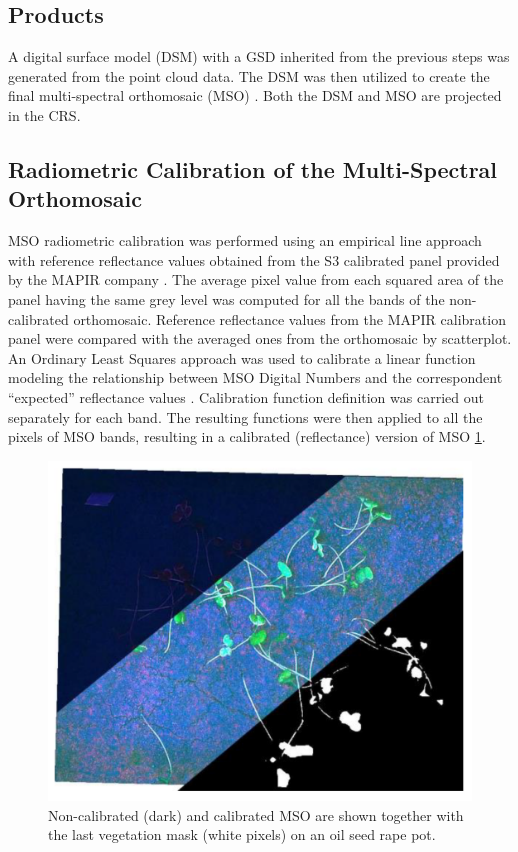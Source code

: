 \documentclass[12pt,a4paper,oneside]{report}
\begin{document}
\subsection{Products}

A digital surface model (DSM) with a GSD inherited from the previous steps was generated from the point cloud data. The DSM was then utilized to create the final multi-spectral orthomosaic (MSO)
\cite{gomarascaElementsPhotogrammetry2009}.
Both the DSM and MSO are projected in the CRS.

\subsection{Radiometric Calibration of the Multi-Spectral Orthomosaic}

MSO radiometric calibration was performed using an empirical line approach with reference reflectance values obtained from the S3 calibrated panel provided by the MAPIR company
\cite{MAPIR_Survey3_Camera_Datasheet_Englishpdf}.
The average pixel value from each squared area of the panel having the same grey level was computed for all the bands of the non-calibrated orthomosaic.
Reference reflectance values from the MAPIR calibration panel were compared with the averaged ones from the orthomosaic by scatterplot. An Ordinary Least Squares approach was used to calibrate a linear function modeling the relationship between MSO Digital Numbers and the correspondent “expected” reflectance values
\cite{cameraMAPIRCameraReflectance}.
Calibration function definition was carried out separately for each band.
The resulting functions were then applied to all the pixels of MSO bands, resulting in a calibrated (reflectance) version of MSO
\cref{fig:mask}.

\begin{figure}[H]
    \centering
    \includegraphics[width=\textwidth]{Images/agronomy-14-00306-g006}
    \caption{Non-calibrated (dark) and calibrated MSO are shown together with the last vegetation mask (white pixels) on an oil seed rape pot.}
    \label{fig:mask}
\end{figure}
\end{document}
